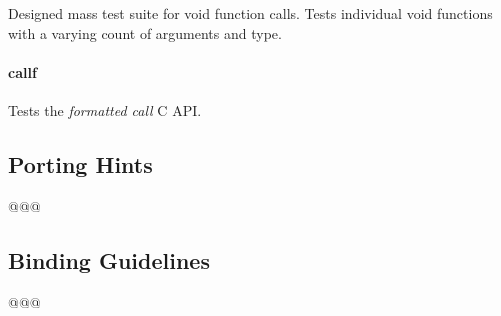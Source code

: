 Designed mass test suite for void function calls.
Tests individual void functions with a varying count of arguments and type.

\paragraph{callf}

Tests the \emph{formatted call}  C API.

\subsection{Porting Hints}

@@@

\subsection{Binding Guidelines}

@@@

